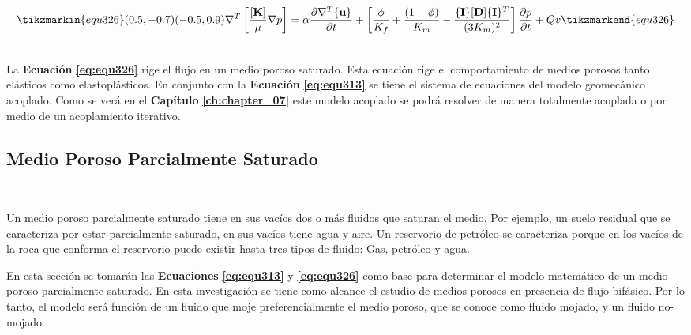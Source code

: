 \begin{ceqn} %
\begin{gather}\label{eq:equ326}
\tikzmarkin{equ326}(0.5,-0.7)(-0.5,0.9)
\normalsize{\nabla^T \left[\frac{[\mathbf{K}]}{\mu}\nabla p\right] = \alpha\frac{\partial \nabla^T \{\mathbf{u}\}}{\partial t} +\left[\frac{\phi}{K_f}+\frac{(1-\phi)}{K_m}-\frac{\{\mathbf{I}\}[\mathbf{D}]\{\mathbf{I}\}^T}{(3K_{m})^{2}}\right]\frac{\partial p}{\partial t} + Qv}
\tikzmarkend{equ326}
\end{gather}   
\end{ceqn}
\\
La \textbf{Ecuación} \textbf{\ref{eq:equ326}} rige el flujo en un medio poroso saturado. Esta ecuación rige el comportamiento de medios porosos tanto elásticos como elastoplásticos. En conjunto con la \textbf{Ecuación} \textbf{\ref{eq:equ313}} se tiene el sistema de ecuaciones del modelo geomecánico acoplado. Como se verá en el \textbf{Capítulo}  \textbf{\ref{ch:chapter_07}} este modelo acoplado se podrá resolver de manera totalmente acoplada o por medio de un acoplamiento iterativo.\vspace{0.4cm}


\subsection{Medio Poroso Parcialmente Saturado}~\hypertarget{sec:sec332}{}
\label{sec:sec332}

Un medio poroso parcialmente saturado tiene en sus vacíos dos o más fluidos que saturan el medio. Por ejemplo, un suelo residual que se caracteriza por estar parcialmente saturado, en sus vacíos tiene agua y aire. Un reservorio de petróleo se caracteriza porque en los vacíos de la roca que conforma el reservorio puede existir hasta tres tipos de fluido: Gas, petróleo y agua.\bigskip

En esta sección se tomarán las \textbf{Ecuaciones} \textbf{\ref{eq:equ313}} y \textbf{\ref{eq:equ326}} como base para determinar el modelo matemático de un medio poroso parcialmente saturado. En esta investigación se tiene como alcance el estudio de medios porosos en presencia de flujo bifásico. Por lo tanto, el modelo será función de un fluido que moje preferencialmente el medio poroso, que se conoce como fluido mojado, y un fluido no-mojado.\bigskip

